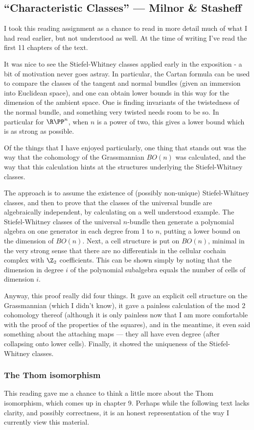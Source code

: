 \documentclass[11pt]{article}
\newcommand{\KanSemResponse}[1]
{
\thispagestyle{fancy}
\subsection*{#1}
}
\begin{document}
\begin{CharacteristicClasses}
\KanSemResponse
{``Characteristic Classes'' --- Milnor \& Stasheff}
I took this reading assignment as a chance to read in more detail much of what I had read earlier, but not understood as well. At the time of writing I've read the first 11 chapters of the text.

It was nice to see the Stiefel-Whitney classes applied early in the exposition - a bit of motivation never goes astray. In particular, the Cartan formula can be used to compare the classes of the tangent and normal bundles (given an immersion into Euclidean space), and one can obtain lower bounds in this way for the dimension of the ambient space. One is finding invariants of the twistedness of the normal bundle, and something very twisted needs room to be so. In particular for $\RP^n$, when $n$ is a power of two, this gives a lower bound which is as strong as possible.

Of the things that I have enjoyed particularly, one thing that stands out was the way that the cohomology of the Grassmannian $BO(n)$ was calculated, and the way that this calculation hints at the structures underlying the Stiefel-Whitney classes.

The approach is to assume the existence of (possibly non-unique) Stiefel-Whitney classes, and then to prove that the classes of the universal bundle are algebraically independent, by calculating on a well understood example. The Stiefel-Whitney classes of the universal $n$-bundle then generate a polynomial algebra on one generator in each degree from 1 to $n$, putting a lower bound on the dimension of $BO(n)$. Next, a cell structure is put on $BO(n)$, minimal in the very strong sense that there are no differentials in the cellular cochain complex with $\Z_2$ coefficients. This can be shown simply by noting that the dimension in degree $i$ of the polynomial subalgebra equals the number of cells of dimension $i$.

Anyway, this proof really did four things. It gave an explicit cell structure on the Grassmannian (which I didn't know), it gave a painless calculation of the mod 2 cohomology thereof (although it is only painless now that I am more comfortable with the proof of the properties of the squares), and in the meantime, it even said something about the attaching maps --- they all have even degree (after collapsing onto lower cells). Finally, it showed the uniqueness of the Stiefel-Whitney classes.

\subsubsection*{The Thom isomorphism}
This reading gave me a chance to think a little more about the Thom isomorphism, which comes up in chapter 9. Perhaps while the following text lacks clarity, and possibly correctness, it is an honest representation of the way I currently view this material.


\end{CharacteristicClasses}
\end{document}
